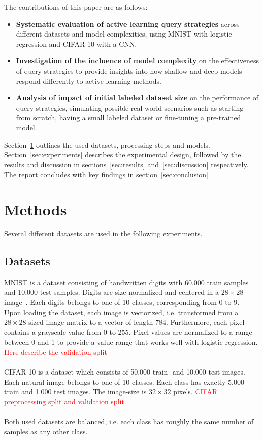 \documentclass{article}
\theoremstyle{plain}
\theoremstyle{definition}
\theoremstyle{remark}
\begin{document}
The contributions of this paper are as follows:
\begin{itemize}
	\item \textbf{Systematic evaluation of active learning query strategies} across different datasets and model complexities, using MNIST with logistic regression and CIFAR-10 with a CNN.
	\item \textbf{Investigation of the incluence of model complexity} on the effectiveness of query strategies to provide insights into how shallow and deep models respond differently to active learning methods.
	\item \textbf{Analysis of impact of initial labeled dataset size} on the performance of query strategies, simulating possible real-world scenarios such as starting from scratch, having a small labeled dataset or fine-tuning a pre-trained model.
\end{itemize}
Section~\ref{sec:methods} outlines the used datasets, processing steps and models. Section~\ref{sec:experiments} describes the experimental design, followed by the results and discussion in sections~\ref{sec:results} and~\ref{sec:discussion} respectively. The report concludes with key findings in section~\ref{sec:conclusion}

\section{Methods}\label{sec:methods}
Several different datasets are used in the following experiments.
\subsection{Datasets}
MNIST is a dataset consisting of handwritten digits with 60.000 train samples and 10.000 test samples. Digits are size-normalized and centered in a $28 \times 28$ image~\cite{mnist}. Each digits belongs to one of 10 classes, corresponding from 0 to 9. \\
Upon loading the dataset, each image is vectorized, i.e. transformed from a $28 \times 28$ sized image-matrix to a vector of length $784$. Furthermore, each pixel contains a grayscale-value from 0 to 255. Pixel values are normalized to a range between 0 and 1 to provide a value range that works well with logistic regression. 
\\
\textcolor{red}{Here describe the validation split}
\\
\\
CIFAR-10 is a dataset which consists of 50.000 train- and 10.000 test-images. Each natural image belongs to one of 10 classes. Each class has exactly 5.000 train and 1.000 test images. The image-size is $32 \times 32$ pixels. 
\textcolor{red}{CIFAR preprocessing split and validation split}
\\
\\
Both used datasets are balanced, i.e. each class has roughly the same number of samples as any other class. 
\end{document}
